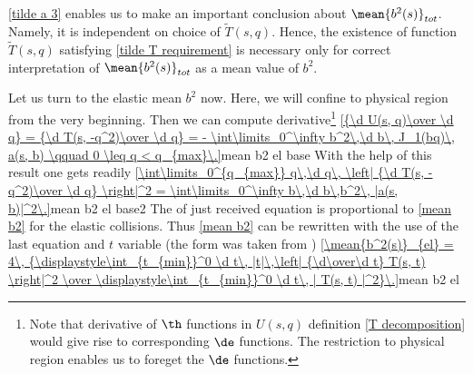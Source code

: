 \Equ{} \ref{tilde a 3} enables us to make an important conclusion about $\mean{b^2(s)}_{tot}$. Namely, it is independent on choice of $\tilde T(s, q)$. Hence, the existence of function $\tilde T(s, q)$ satisfying \ref{tilde T requirement} is necessary only for correct interpretation of $\mean{b^2(s)}_{tot}$ as a mean value of $b^2$.

Let us turn to the elastic mean $b^2$ now. Here, we will confine to physical region from the very beginning. Then we can compute derivative\footnote{Note that derivative of $\th$ functions in $U(s, q)$ definition \ref{T decomposition} would give rise to corresponding $\de$ functions. The restriction to physical region enables us to foreget the $\de$ functions.}
\eqref{{\d U(s, q)\over \d q} = {\d T(s, -q^2)\over \d q} = - \int\limits_0^\infty b^2\,\d b\, J_1(bq)\, a(s, b) \qquad 0 \leq q < q_{max}\.}{mean b2 el base}
With the help of this result one gets readily
\eqref{\int\limits_0^{q_{max}} q\,\d q\, \left| {\d T(s, -q^2)\over \d q} \right|^2 = \int\limits_0^\infty b\,\d b\,b^2\, |a(s, b)|^2\.}{mean b2 el base2}
The \rhs{} of just received equation is proportional to \ref{mean b2} for the elastic collisions. Thus \ref{mean b2} can be rewritten with the use of the last equation and $t$ variable (the form was taken from \rf{} )
\eqref{\mean{b^2(s)}_{el} = 4\, {\displaystyle\int_{t_{min}}^0  \d t\, |t|\,\left| {\d\over\d t} T(s, t) \right|^2 \over \displaystyle\int_{t_{min}}^0 \d t\, | T(s, t) |^2}\.}{mean b2 el}

\bmfig
{}
\emfig

{\SmallerFonts {}}

\bmfig%
%
\emfig

